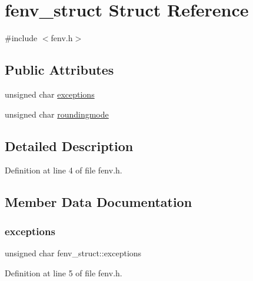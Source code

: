 \hypertarget{structfenv__struct}{}\section{fenv\+\_\+struct Struct Reference}
\label{structfenv__struct}


{\ttfamily \#include $<$fenv.\+h$>$}

\subsection*{Public Attributes}
\begin{DoxyCompactItemize}
\item 
unsigned char \mbox{\hyperlink{structfenv__struct_a6e56d096c40ad47e95c53d0247450e9c}{exceptions}}
\item 
unsigned char \mbox{\hyperlink{structfenv__struct_a3505c264875fc2afc8e2539cb7917191}{roundingmode}}
\end{DoxyCompactItemize}


\subsection{Detailed Description}


Definition at line 4 of file fenv.\+h.



\subsection{Member Data Documentation}
\mbox{\label{structfenv__struct_a6e56d096c40ad47e95c53d0247450e9c}} 
\subsubsection{\texorpdfstring{exceptions}{exceptions}}
{\footnotesize\ttfamily unsigned char fenv\+\_\+struct\+::exceptions}



Definition at line 5 of file fenv.\+h.

\mbox{\label{structfenv__struct_a3505c264875fc2afc8e2539cb7917191}} 
